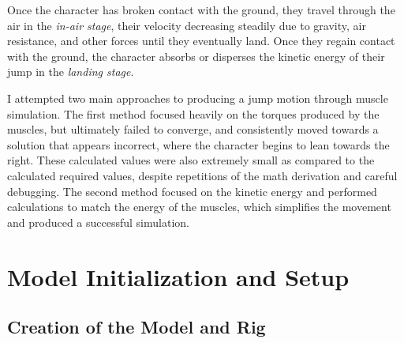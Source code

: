 Once the character has broken contact with the ground, they travel through the air in the \emph{in-air stage}, their velocity decreasing steadily due to gravity, air resistance, and other forces until they eventually land.  Once they regain contact with the ground, the character absorbs or disperses the kinetic energy of their jump in the \emph{landing stage}.

I attempted two main approaches to producing a jump motion through muscle simulation.  The first method focused heavily on the torques produced by the muscles, but ultimately failed to converge, and consistently moved towards a solution that appears incorrect, where the character begins to lean towards the right.  These calculated values were also extremely small as compared to the calculated required values, despite repetitions of the math derivation and careful debugging.  The second method focused on the kinetic energy and performed calculations to match the energy of the muscles, which simplifies the movement and produced a successful simulation.

\section{Model Initialization and Setup}
\label{section:setup_inputs}
\subsection{Creation of the Model and Rig}
\label{subsection:model_rig}


